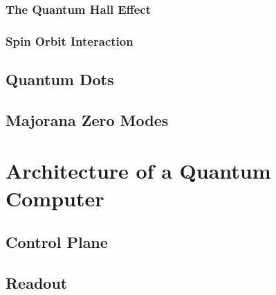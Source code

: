 \subsubsection{The Quantum Hall Effect}
\subsubsection{Spin Orbit Interaction}
\subsection{Quantum Dots}
\subsection{Majorana Zero Modes}

\section{Architecture of a Quantum Computer}
\label{sec:arch}
  \subsection{Control Plane}
  \subsection{Readout}